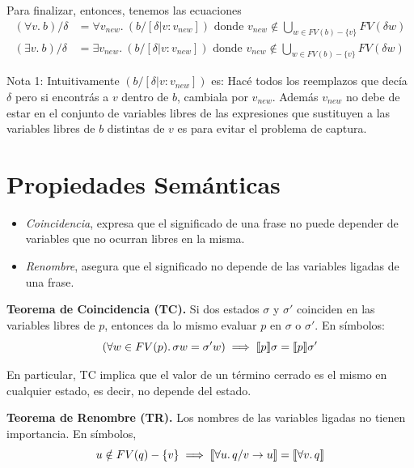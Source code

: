 \documentclass[a4paper,12pt]{article}
\begin{document}
Para finalizar, entonces, tenemos las ecuaciones
\begin{align*}
    (\forall v . \ b) / \delta &= \forall v_{new} . \ (b / [\delta | v : v_{new}]) \text{ donde } v_{new} \notin \bigcup_{w \in FV(b) - \{v\}} FV(\delta w) \tag{Nota 1}\\
    (\exists v . \ b) / \delta &= \exists v_{new} . \ (b / [\delta | v : v_{new}]) \text{ donde } v_{new} \notin \bigcup_{w \in FV(b) - \{v\}} FV(\delta w)
\end{align*}

\begin{tcolorbox}[title=Notaciones de autora]
    Nota 1: Intuitivamente $(b / [\delta | v : v_{new}])$ es: Hacé todos los reemplazos que decía $\delta$ pero si encontrás a $v$ dentro de $b$, cambiala por $v_{new}$. 
    Además $v_{new}$ no debe de estar en el conjunto de variables libres de las expresiones que sustituyen a las variables libres de $b$ distintas de $v$ es para evitar el problema de captura.
\end{tcolorbox}

\section{Propiedades Semánticas}

\begin{itemize}
\item \textit{Coincidencia}, expresa que el significado de una frase no puede depender de variables que no ocurran libres en la misma. 
\item \textit{Renombre}, asegura que el significado no depende de las variables ligadas de una frase.
\end{itemize}

\medskip

\noindent \textbf{Teorema de Coincidencia (TC).} Si dos estados $\sigma$ y $\sigma'$ coinciden en las variables libres de $p$, entonces da lo mismo evaluar $p$ en $\sigma$ o $\sigma'$. En símbolos:
\[
(\forall w \in FV(p) \ldotp \sigma w = \sigma' w) \implies \llbracket p \rrbracket \sigma = \llbracket p \rrbracket \sigma'
\]

En particular, TC implica que el valor de un término cerrado es el mismo en cualquier estado, es decir, no depende del estado.

\medskip

\noindent \textbf{Teorema de Renombre (TR).} Los nombres de las variables ligadas no tienen importancia. En símbolos,
\[
u \notin FV(q) - \{v\} \implies \llbracket \forall u \ldotp q / v \to u \rrbracket = \llbracket \forall v \ldotp q \rrbracket
\]
\end{document}
